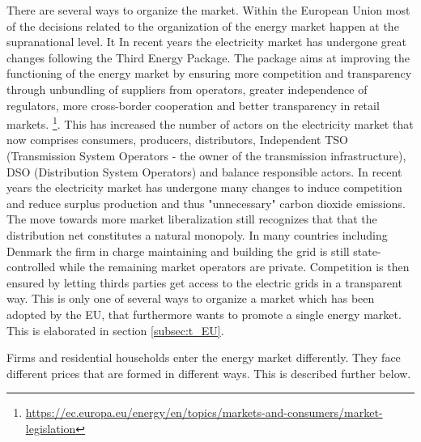 There are several ways to organize the market. Within the European Union most of the decisions related to the organization of the energy market happen at the supranational level. It In recent years the electricity market has undergone great changes following the Third Energy Package. The package aims at improving the functioning of the energy market by ensuring more competition and transparency through unbundling of suppliers from operators, greater independence of regulators, more cross-border cooperation and better transparency in retail markets. \footnote{\url{https://ec.europa.eu/energy/en/topics/markets-and-consumers/market-legislation}}. This has increased the number of actors on the electricity market that now comprises consumers, producers, distributors, Independent TSO (Transmission System Operators - the owner of the transmission infrastructure), DSO (Distribution System Operators) and balance responsible actors.
\medskip
In recent years the electricity market has undergone many changes to induce competition and reduce surplus production and thus "unnecessary" carbon dioxide emissions. The move towards more market liberalization still recognizes that that the distribution net constitutes a natural monopoly. In many countries including Denmark the firm in charge maintaining and building the grid is still state-controlled while the remaining market operators are private. Competition is then ensured by letting thirds parties get access to the electric grids in a transparent way. This is only one of several ways to organize a market which has been adopted by the EU, that furthermore wants to promote a single energy market. This is elaborated in section \ref{subsec:t_EU}.
\par 

Firms and residential households enter the energy market differently. They face different prices that are formed in different ways. This is described further below.

